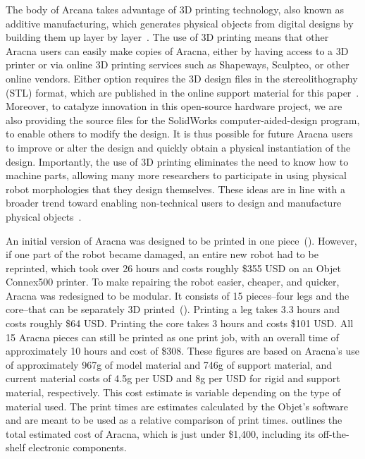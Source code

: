 \documentclass[letterpaper]{article}
\begin{document}
The body of Arcana takes advantage of 3D printing technology, also known as additive manufacturing, which generates physical objects from digital designs by building them up layer by layer~\citep{gibson2009additive, lipson2010factory}. The use of 3D printing means that other Aracna users can easily make copies of Aracna, either by having access to a 3D printer or via online 3D printing services such as Shapeways, Sculpteo, or other online vendors. Either option requires the 3D design files in the stereolithography (STL) format, which are published in the online support material for this paper~\citep{WEB}. Moreover, to catalyze innovation in this open-source hardware project, we are also providing the source files for the SolidWorks computer-aided-design program, to enable others to modify the design. It is thus possible for future Aracna users to improve or alter the design and quickly obtain a physical instantiation of the design. Importantly, the use of 3D printing eliminates the need to know how to machine parts, allowing many more researchers to participate in using physical robot morphologies that they design themselves. These ideas are in line with a broader trend toward enabling non-technical users to design and manufacture physical objects~\citep{clune2011objects, clune2011endless, lipson2010factory}.

An initial version of Aracna was designed to be printed in one piece~(). However, if one part of the robot became damaged, an entire new robot had to be reprinted, which took over 26 hours and costs roughly \$355 USD on an Objet Connex500 printer. To make repairing the robot easier, cheaper, and quicker, Aracna was redesigned to be modular. It consists of 15 pieces--four legs and the core--that can be separately 3D printed~(). Printing a leg takes 3.3 hours and costs roughly \$64 USD. Printing the core takes 3 hours and costs \$101 USD. All 15 Aracna pieces can still be printed as one print job, with an overall time of approximately 10 hours and cost of \$308. These figures are based on Aracna's use of  approximately 967g of model material and 746g of support material, and current material costs of 4.5g per USD and 8g per USD for rigid and support material, respectively. This cost estimate is variable depending on the type of material used. The print times are estimates calculated by the Objet's software and are meant to be used as a relative comparison of print times.  outlines the total estimated cost of Aracna, which is just under \$1,400, including its off-the-shelf electronic components.
\end{document}

